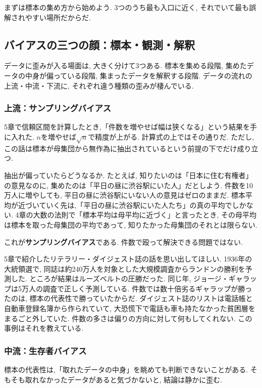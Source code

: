 まずは標本の集め方から始めよう.
3つのうち最も入口に近く, それでいて最も誤解されやすい場所だからだ.


\subsection{バイアスの三つの顔：標本・観測・解釈}

データに歪みが入る場面は, 大きく分けて3つある.
標本を集める段階, 集めたデータの中身が偏っている段階, 集まったデータを解釈する段階.
データの流れの上流・中流・下流に, それぞれ違う種類の歪みが棲んでいる.

\subsubsection*{上流：サンプリングバイアス}

5章で信頼区間を計算したとき,「件数を増やせば幅は狭くなる」という結果を手に入れた.
$n$を増やせば$\sqrt{n}$で精度が上がる. 計算式の上ではその通りだ.
ただし, この話は標本が母集団から無作為に抽出されているという前提の下でだけ成り立つ.

抽出が偏っていたらどうなるか.
たとえば, 知りたいのは「日本に住む有権者」の意見なのに, 集めたのは「平日の昼に渋谷駅にいた人」だとしよう.
件数を10万人に増やしても, 平日の昼に渋谷駅にいない人の意見はゼロのままだ.
標本平均が近づいていく先は,「平日の昼に渋谷駅にいた人たち」の真の平均でしかない.
4章の大数の法則で「標本平均は母平均に近づく」と言ったとき, その母平均は標本を取った母集団の平均であって, 知りたかった母集団のそれとは限らない.

これが\textbf{サンプリングバイアス}である. 件数で殴って解決できる問題ではない.

5章で紹介したリテラリー・ダイジェスト誌の話を思い出してほしい.
1936年の大統領選で, 同誌は約240万人を対象とした大規模調査からランドンの勝利を予測した.
ところが結果はルーズベルトの圧勝だった. 同じ年, ジョージ・ギャラップは5万人の調査で正しく予測している.
件数では数十倍劣るギャラップが勝ったのは, 標本の代表性で勝っていたからだ.
ダイジェスト誌のリストは電話帳と自動車登録名簿から作られていて, 大恐慌下で電話も車も持たなかった貧困層をまるごと外していた.
件数の多さは偏りの方向に対して何もしてくれない. この事例はそれを教えている.

\subsubsection*{中流：生存者バイアス}

標本の代表性は,「取れたデータの中身」を眺めても判断できないことがある.
そもそも取れなかったデータがあると気づかないと, 結論は静かに歪む.

